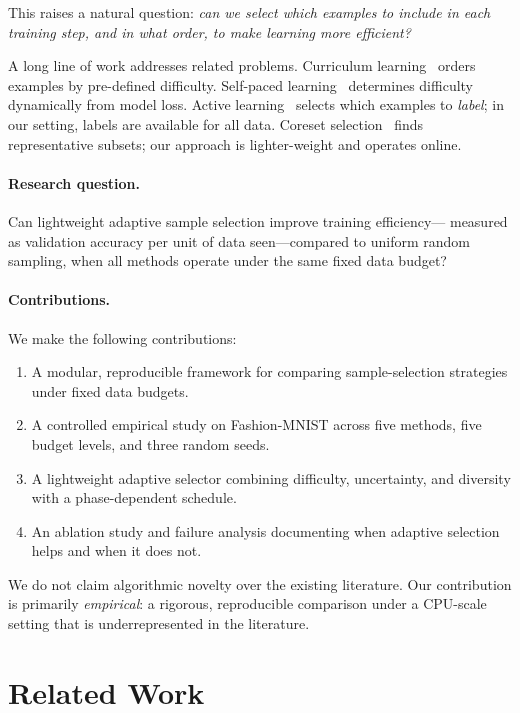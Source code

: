 \documentclass[10pt,twocolumn]{article}
\begin{document}
This raises a natural question: \emph{can we select which examples to
include in each training step, and in what order, to make learning
more efficient?}

A long line of work addresses related problems.
Curriculum learning~\citep{bengio2009curriculum} orders examples by
pre-defined difficulty.
Self-paced learning~\citep{kumar2010selfpaced} determines difficulty
dynamically from model loss.
Active learning~\citep{ren2021survey} selects which examples to
\emph{label}; in our setting, labels are available for all data.
Coreset selection~\citep{mirzasoleiman2020craig} finds representative
subsets; our approach is lighter-weight and operates online.

\paragraph{Research question.}
Can lightweight adaptive sample selection improve training efficiency---
measured as validation accuracy per unit of data seen---compared to
uniform random sampling, when all methods operate under the same fixed
data budget?

\paragraph{Contributions.}
We make the following contributions:
\begin{enumerate}
  \item A modular, reproducible framework for comparing sample-selection
    strategies under fixed data budgets.
  \item A controlled empirical study on Fashion-MNIST across five methods,
    five budget levels, and three random seeds.
  \item A lightweight adaptive selector combining difficulty, uncertainty,
    and diversity with a phase-dependent schedule.
  \item An ablation study and failure analysis documenting when adaptive
    selection helps and when it does not.
\end{enumerate}

We do not claim algorithmic novelty over the existing literature.
Our contribution is primarily \emph{empirical}: a rigorous, reproducible
comparison under a CPU-scale setting that is underrepresented in the literature.

\section{Related Work}
\label{sec:related}
\end{document}
